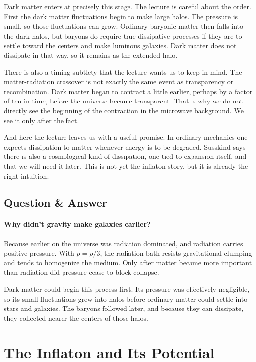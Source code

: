 Dark matter enters at precisely this stage. The lecture is careful about the order. First the dark matter fluctuations begin to make large halos. The pressure is small, so those fluctuations can grow. Ordinary baryonic matter then falls into the dark halos, but baryons do require true dissipative processes if they are to settle toward the centers and make luminous galaxies. Dark matter does not dissipate in that way, so it remains as the extended halo.

There is also a timing subtlety that the lecture wants us to keep in mind. The matter-radiation crossover is not exactly the same event as transparency or recombination. Dark matter began to contract a little earlier, perhaps by a factor of ten in time, before the universe became transparent. That is why we do not directly see the beginning of the contraction in the microwave background. We see it only after the fact.

And here the lecture leaves us with a useful promise. In ordinary mechanics one expects dissipation to matter whenever energy is to be degraded. Susskind says there is also a cosmological kind of dissipation, one tied to expansion itself, and that we will need it later. This is not yet the inflaton story, but it is already the right intuition.

\subsection{Question \& Answer}

\paragraph{Why didn't gravity make galaxies earlier?}

Because earlier on the universe was radiation dominated, and radiation carries positive pressure. With \(p=\rho/3\), the radiation bath resists gravitational clumping and tends to homogenize the medium. Only after matter became more important than radiation did pressure cease to block collapse.

Dark matter could begin this process first. Its pressure was effectively negligible, so its small fluctuations grew into halos before ordinary matter could settle into stars and galaxies. The baryons followed later, and because they can dissipate, they collected nearer the centers of those halos.

\section{The Inflaton and Its Potential}

